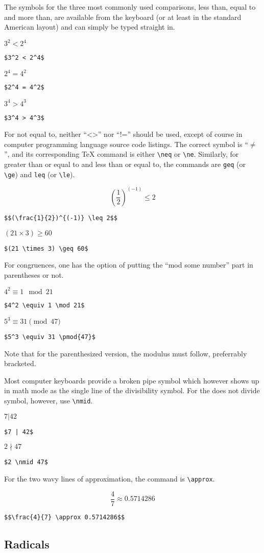 The symbols for the three most commonly used comparisons, less than, equal to and more than, are available from the keyboard (or at least in the standard American layout) and can simply be typed straight in.

$3^2 < 2^4$

\verb'$3^2 < 2^4$'

$2^4 = 4^2$

\verb'$2^4 = 4^2$'

$3^4 > 4^3$

\verb'$3^4 > 4^3$'

For not equal to, neither ``<>'' nor ``!='' should be used, except of course in computer programming language source code listings. The correct symbol is ``$\neq$'', and its corresponding \TeX{} command is either \verb=\neq= or \verb=\ne=. Similarly, for greater than or equal to and less than or equal to, the commands are \verb=geq= (or \verb=\ge=) and \verb=leq= (or \verb=\le=).

$$\left(\frac{1}{2}\right)^{(-1)} \leq 2$$

\verb'$$(\frac{1}{2})^{(-1)} \leq 2$$'

$(21 \times 3) \geq 60$

\verb'$(21 \times 3) \geq 60$'

For congruences, one has the option of putting the ``mod some number'' part in parentheses or not.

$4^2 \equiv 1 \mod 21$

\verb'$4^2 \equiv 1 \mod 21$'

$5^3 \equiv 31 \pmod{47}$

\verb'$5^3 \equiv 31 \pmod{47}$'

Note that for the parenthesized version, the modulus must follow, preferrably bracketed.

Most computer keyboards provide a broken pipe symbol which however shows up in math mode as the single line of the divisibility symbol. For the does not divide symbol, however, use \verb=\nmid=.

$7 | 42$

\verb'$7 | 42$'

$2 \nmid 47$

\verb'$2 \nmid 47$'

For the two wavy lines of approximation, the command is \verb=\approx=.

$$\frac{4}{7} \approx 0.5714286$$

\verb'$$\frac{4}{7} \approx 0.5714286$$'

\subsection{Radicals}

